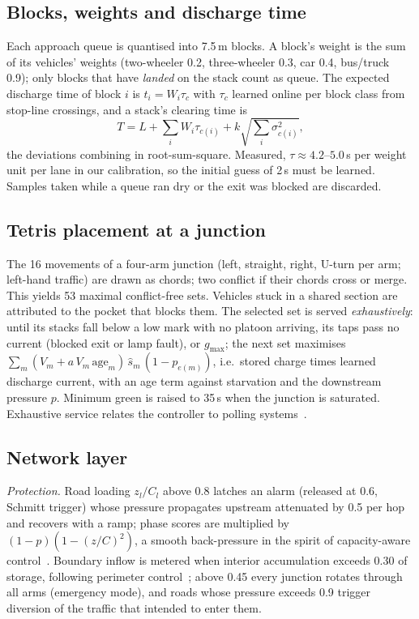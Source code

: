 \documentclass[journal]{IEEEtran}
\begin{document}
\subsection{Blocks, weights and discharge time}
Each approach queue is quantised into 7.5\,m blocks. A block's weight is the sum of
its vehicles' weights (two-wheeler 0.2, three-wheeler 0.3, car 0.4, bus/truck 0.9);
only blocks that have \emph{landed} on the stack count as queue. The expected
discharge time of block $i$ is $t_i=W_i\tau_c$ with $\tau_c$ learned online per block
class from stop-line crossings, and a stack's clearing time is
\begin{equation}
T=L+\sum_i W_i\tau_{c(i)}+k\sqrt{\textstyle\sum_i\sigma_{c(i)}^2},
\end{equation}
the deviations combining in root-sum-square. Measured, $\tau\approx4.2$--$5.0$\,s per
weight unit per lane in our calibration, so the initial guess of 2\,s must be learned.
Samples taken while a queue ran dry or the exit was blocked are discarded.

\subsection{Tetris placement at a junction}
The 16 movements of a four-arm junction (left, straight, right, U-turn per arm; left-hand
traffic) are drawn as chords; two conflict if their chords cross or merge. This yields
53 maximal conflict-free sets. Vehicles stuck in a shared section are attributed to
the pocket that blocks them. The selected set is served \emph{exhaustively}: until its
stacks fall below a low mark with no platoon arriving, its taps pass no current
(blocked exit or lamp fault), or $g_{\max}$; the next set maximises
$\sum_m (V_m + a\,V_m\,\mathrm{age}_m)\,\hat s_m\,(1-p_{e(m)})$, i.e.\ stored charge
times learned discharge current, with an age term against starvation and the
downstream pressure $p$. Minimum green is raised to 35\,s when the junction is
saturated. Exhaustive service relates the controller to polling
systems~\cite{takagi1986polling}.

\subsection{Network layer}
\emph{Protection.} Road loading $z_l/C_l$ above 0.8 latches an alarm (released at 0.6,
Schmitt trigger) whose pressure propagates upstream attenuated by 0.5 per hop and
recovers with a ramp; phase scores are multiplied by $(1-p)(1-(z/C)^2)$, a smooth
back-pressure in the spirit of capacity-aware control~\cite{gregoire2015capacity}.
Boundary inflow is metered when interior accumulation exceeds 0.30 of storage,
following perimeter control~\cite{geroliminis2008yokohama}; above 0.45 every junction
rotates through all arms (emergency mode), and roads whose pressure exceeds 0.9 trigger
diversion of the traffic that intended to enter them.
\end{document}
